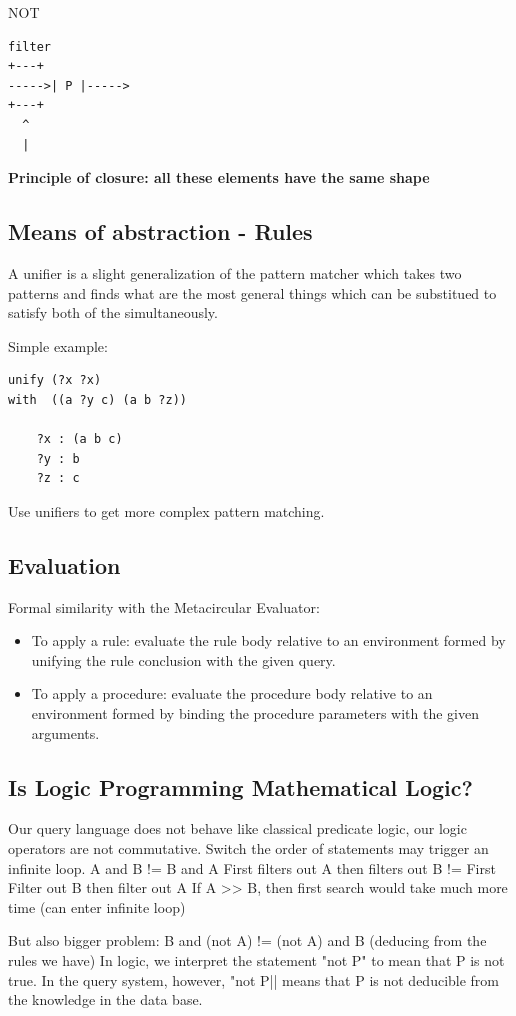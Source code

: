 \documentclass[a4paper,twoside]{article}
\numberwithin{equation}{section}
\begin{document}
NOT
\begin{lstlisting}
filter
+---+
----->| P |----->
+---+
  ^
  |
\end{lstlisting}
\textbf{Principle of closure: all these elements have the same shape}

\subsection{Means of abstraction - Rules}
A unifier is a slight generalization of the pattern matcher which takes two patterns and finds what are the most general things which can be substitued to satisfy both of the simultaneously.

Simple example:

\begin{lstlisting}
unify (?x ?x)
with  ((a ?y c) (a b ?z))

    ?x : (a b c)
    ?y : b
    ?z : c
\end{lstlisting}
Use unifiers to get more complex pattern matching.

\subsection{Evaluation}
Formal similarity with the Metacircular Evaluator:
\begin{itemize}
    \item To apply a rule: evaluate the rule body relative to an environment formed by unifying the rule conclusion with the given query.
    \item To apply a procedure: evaluate the procedure body relative to an environment formed by binding the procedure parameters with the given arguments.
\end{itemize}

\subsection{Is Logic Programming Mathematical Logic?}
Our query language does not behave like classical predicate logic, our logic operators are not commutative.
Switch the order of statements may trigger an infinite loop.
A and B != B and A
First filters out A then filters out B != First Filter out B then filter out A
If A >> B, then first search would take much more time (can enter infinite loop)

But also bigger problem:
B and (not A) != (not A) and B (deducing from the rules we have)
In logic, we interpret the statement "not P" to mean that P is not true. In the query system, however,
"not P|| means that P is not deducible from the knowledge in the data base.
\end{document}

